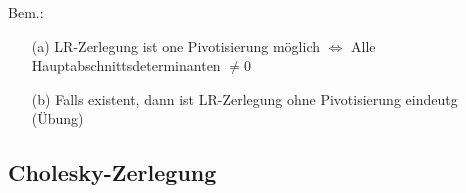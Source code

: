 Bem.:
\begin{enumerate}
\item[(a)]
LR-Zerlegung ist one Pivotisierung möglich $\Leftrightarrow$
 Alle Hauptabschnittsdeterminanten $\neq 0$
\item[(b)]
Falls existent, dann ist LR-Zerlegung ohne Pivotisierung eindeutg (Übung)
\end{enumerate}
\subsection{Cholesky-Zerlegung}

